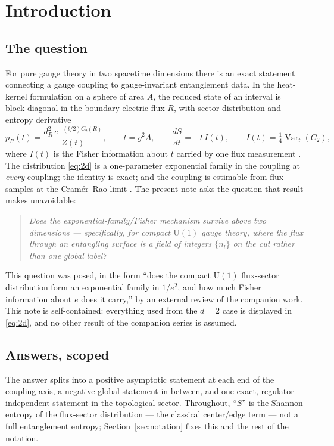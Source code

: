 \documentclass[11pt]{article}
\theoremstyle{remark}
\theoremstyle{plain}
\newcommand{\Var}{\operatorname{Var}}
\begin{document}
\section{Introduction}\label{sec:intro}

\subsection{The question}

For pure gauge theory in two spacetime dimensions there is an exact statement connecting a gauge coupling to gauge-invariant entanglement data. In the heat-kernel formulation on a sphere of area $A$, the reduced state of an interval is block-diagonal in the boundary electric flux $R$, with sector distribution and entropy derivative
\begin{equation}\label{eq:2d}
p_R(t) = \frac{d_R^2\, e^{-(t/2) C_2(R)}}{Z(t)}, \qquad t = g^2 A, \qquad \frac{dS}{dt} = -t\, I(t), \qquad I(t) = \tfrac14 \Var_t(C_2),
\end{equation}
where $I(t)$ is the Fisher information about $t$ carried by one flux measurement \cite{D14, GS14, P3}. The distribution \eqref{eq:2d} is a one-parameter exponential family in the coupling at \emph{every} coupling; the identity is exact; and the coupling is estimable from flux samples at the Cram\'er--Rao limit \cite{P3}. The present note asks the question that result makes unavoidable:

\begin{quote}
\emph{Does the exponential-family/Fisher mechanism survive above two dimensions --- specifically, for compact $\mathrm{U}(1)$ gauge theory, where the flux through an entangling surface is a field of integers $\{n_l\}$ on the cut rather than one global label?}
\end{quote}

This question was posed, in the form ``does the compact $\mathrm{U}(1)$ flux-sector distribution form an exponential family in $1/e^2$, and how much Fisher information about $e$ does it carry,'' by an external review of the companion work. This note is self-contained: everything used from the $d=2$ case is displayed in \eqref{eq:2d}, and no other result of the companion series is assumed.

\subsection{Answers, scoped}

The answer splits into a positive asymptotic statement at each end of the coupling axis, a negative global statement in between, and one exact, regulator-independent statement in the topological sector. Throughout, ``$S$'' is the Shannon entropy of the flux-sector distribution --- the classical center/edge term --- not a full entanglement entropy; Section~\ref{sec:notation} fixes this and the rest of the notation.
\end{document}
